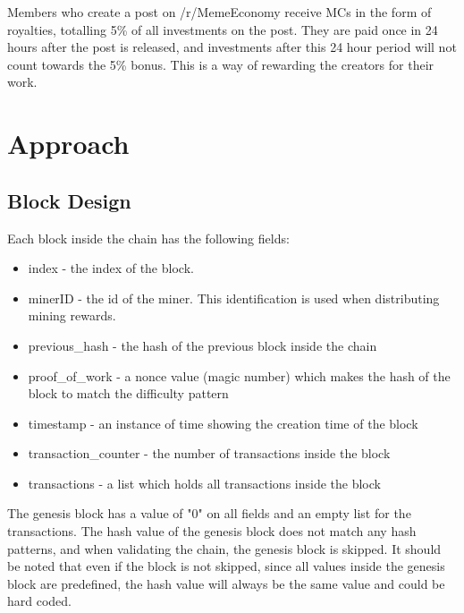 \documentclass[12pt]{article}
\begin{document}
Members who create a post on /r/MemeEconomy receive \acp{MC} in the form of royalties, totalling 5\% of all investments on the post. They are paid once in 24 hours after the post is released, and investments after this 24 hour period will not count towards the 5\% bonus. This is a way of rewarding the creators for their work.


\section{Approach} \label{sec:Approach}

\subsection{Block Design} \label{sec:BlockDesign} %

Each block inside the chain has the following fields:

\begin{itemize}
  \item index - the index of the block.
  \item minerID - the id of the miner. This identification is used when distributing mining rewards.
  \item previous\_hash - the hash of the previous block inside the chain
  \item proof\_of\_work - a nonce value (magic number) which makes the hash of the block to match the difficulty pattern
  \item timestamp - an instance of time showing the creation time of the block
  \item transaction\_counter - the number of transactions inside the block
  \item transactions - a list which holds all transactions inside the block
\end{itemize}



The genesis block has a value of "0" on all fields and an empty list for the transactions. The hash value of the genesis block does not match any hash patterns, and when validating the chain, the genesis block is skipped. It should be noted that even if the block is not skipped, since all values inside the genesis block are predefined, the hash value will always be the same value and could be hard coded.
\end{document}
